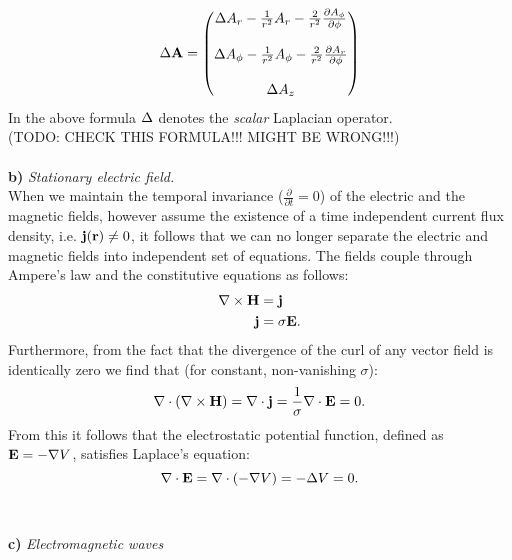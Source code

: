 \documentclass[11pt,a4paper]{report}
\def\Nabla{\ensuremath\bm{\nabla}}
\def\bm{\ensuremath\mathbf}
\def\curl{\ensuremath\Nabla\times}
\def\div{\ensuremath\Nabla\cdot}
\def\lap{\ensuremath\Delta}
\def\vlap{\ensuremath\Delta}
\begin{document}
\begin{equation*}
  \vlap \bm{A} =
  \begin{pmatrix} 
    \lap A_r - \frac{1}{r^2}A_r-\frac{2}{r^2}\frac{\partial A_\phi}{\partial \phi} \\ \\
    \lap A_\phi - \frac{1}{r^2}A_\phi-\frac{2}{r^2}\frac{\partial A_r}{\partial \phi} \\ \\    
    \lap A_z
  \end{pmatrix}
\end{equation*}  
In the above formula $\lap$ denotes the \emph{scalar} Laplacian operator. \\ 
(TODO: CHECK THIS FORMULA!!! MIGHT BE WRONG!!!)\\\\
\textbf{b)} \emph{Stationary electric field.} \\

When we maintain the temporal invariance ($\frac{\partial}{\partial t}=0$) of the electric and the magnetic fields, however assume the existence of a time independent current flux density, i.e. $\bm{j}(\bm{r}) \neq 0 $, it follows that we can no longer separate the electric and magnetic fields into independent set of equations. The fields couple through Ampere's law and the constitutive equations as follows:
\begin{align*}
  \curl \bm{H} &= \bm{j}\\
  \bm{j} &= \sigma \bm{E}. 
\end{align*}
Furthermore, from the fact that the divergence of the curl of any vector field is identically zero we find that (for constant, non-vanishing $\sigma$): 
\begin{equation*}
  \div (\curl \bm{H}) = \div \bm{j} = \frac{1}{\sigma}\div \bm{E} = 0. 
\end{equation*}
From this it follows that the electrostatic potential function, defined as $\bm{E}=-\Nabla V$, satisfies Laplace's equation:
\begin{equation*}
  \div \bm{E} = \div (-\Nabla V) = -\lap V = 0. 
\end{equation*}\\\\
\textbf{c)} \emph{Electromagnetic waves}\\
\end{document}

